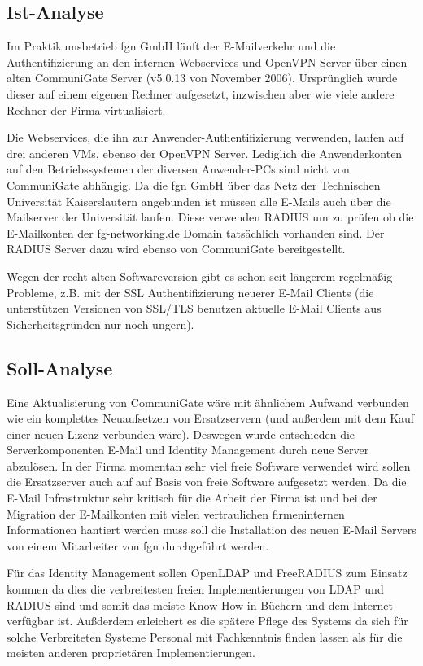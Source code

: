 \documentclass[11pt,a4paper,titlepage=firstiscover]{scrartcl} %
\begin{document}
\subsection{Ist-Analyse}
Im Praktikumsbetrieb fgn GmbH l\"auft der E-Mailverkehr und die Authentifizierung an den internen Webservices und OpenVPN Server \"uber einen alten CommuniGate Server (v5.0.13 von November 2006). Urspr\"unglich wurde dieser auf einem eigenen Rechner aufgesetzt, inzwischen aber wie viele andere Rechner der Firma virtualisiert. 

Die Webservices, die ihn zur Anwender-Authentifizierung verwenden, laufen auf drei anderen VMs, ebenso der OpenVPN Server. Lediglich die Anwenderkonten auf den Betriebssystemen der diversen Anwender-PCs sind nicht von CommuniGate abh\"angig. Da die fgn GmbH \"uber das Netz der Technischen Universit\"at Kaiserslautern angebunden ist m\"ussen alle E-Mails auch \"uber die Mailserver der Universit\"at laufen. Diese verwenden RADIUS um zu pr\"ufen ob die E-Mailkonten der fg-networking.de Domain tats\"achlich vorhanden sind. Der RADIUS Server dazu wird ebenso von CommuniGate bereitgestellt. 

Wegen der recht alten Softwareversion gibt es schon seit l\"angerem regelm\"a\ss{}ig Probleme, z.B. mit der SSL Authentifizierung neuerer E-Mail Clients (die unterst\"utzen Versionen von SSL/TLS benutzen aktuelle E-Mail Clients aus Sicherheitsgr\"unden nur noch ungern).

\subsection{Soll-Analyse}
Eine Aktualisierung von CommuniGate w\"are mit \"ahnlichem Aufwand verbunden wie ein komplettes Neuaufsetzen von Ersatzservern (und au\ss{}erdem mit dem Kauf einer neuen Lizenz verbunden w\"are). Deswegen wurde entschieden die Serverkomponenten E-Mail und Identity Management durch neue Server abzul\"osen. In der Firma momentan sehr viel freie Software verwendet wird sollen die Ersatzserver auch auf auf Basis von freie Software aufgesetzt werden. Da die E-Mail Infrastruktur sehr kritisch f\"ur die Arbeit der Firma ist und bei der Migration der E-Mailkonten mit vielen vertraulichen firmeninternen Informationen hantiert werden muss soll die Installation des neuen E-Mail Servers von einem Mitarbeiter von fgn durchgef\"uhrt werden.

F\"ur das Identity Management sollen OpenLDAP und FreeRADIUS zum Einsatz kommen da dies die verbreitesten freien Implementierungen von LDAP und RADIUS sind und somit das meiste Know How in B\"uchern und dem Internet verf\"ugbar ist. Au\ss{}derdem erleichert es die sp\"atere Pflege des Systems da sich f\"ur solche Verbreiteten Systeme Personal mit Fachkenntnis finden lassen als f\"ur die meisten anderen propriet\"aren Implementierungen.
\end{document}
